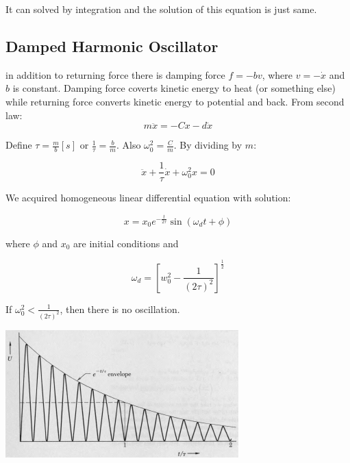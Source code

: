 It can solved by integration and the solution of this equation is just same. 

\subsection{Damped Harmonic Oscillator}

in addition to returning force there is damping force $f=-bv$, where $v = -\dot{x}$ and $b$ is constant. Damping force coverts kinetic energy to heat (or something else) while returning force converts kinetic energy to potential and back. From second law:
$$m\ddot{x} = -Cx-d\dot{x}$$

Define $\tau = \frac{m}{b} [s]$ or $\frac{1}{\tau} = \frac{b}{m}$. Also $\omega_0^2 = \frac{C}{m}$. By dividing by $m$:

$$\ddot{x} + \frac{1}{\tau}\dot{x} + \omega_0^2x = 0$$

We acquired homogeneous linear differential equation with solution:

$$x=x_0e^{-\frac{t}{2\tau}}\sin\left( \omega_d t + \phi \right)$$

where $\phi$ and $x_0$ are initial conditions and

$$\omega_d = \left[ w_0^2 - \frac{1}{\left( 2\tau \right)^2} \right]^{\frac{1}{2}}$$

If $\omega_0^2 < \frac{1}{\left( 2 \tau \right)^2}$, then there is no oscillation.


\begin{center}
	\includegraphics[width=\linewidth]{./lect18/pic5.png}
\end{center}